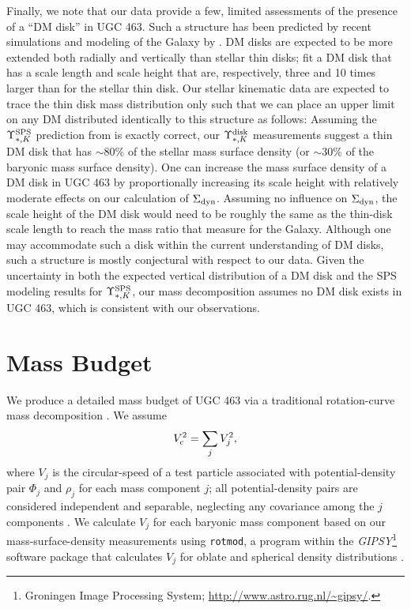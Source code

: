 \documentclass[apj,iop,numberedappendix]{emulateapj}
\begin{document}
Finally, we note that our data provide a few, limited assessments of the
presence of a ``DM disk'' in UGC 463.  Such a structure has been predicted by
recent simulations \citep[e.g.,][]{2009MNRAS.397...44R} and modeling of the
Galaxy by \citet{2003ApJ...588..805K} \citep[cf.,][]{2010ApJ...724L.122M}.  DM
disks are expected to be more extended both radially and vertically than stellar
thin disks; \citet{2003ApJ...588..805K} fit a DM disk that has a scale length
and scale height that are, respectively, three and 10 times larger than for the
stellar thin disk.  Our stellar kinematic data are expected to trace the thin
disk mass distribution only such that we can place an upper limit on any DM
distributed identically to this structure as follows:  Assuming the $\Upsilon_{\ast,K}^{\rm SPS}$
prediction from  is exactly correct, our
$\Upsilon_{\ast,K}^{\rm disk}$ measurements suggest a thin DM disk that has $\sim80$\% of the
stellar mass surface density (or $\sim30$\% of the baryonic mass surface
density).  One can increase the mass surface density of a DM disk in UGC 463 by
proportionally increasing its scale height with relatively moderate effects on
our calculation of $\Sigma_{\rm dyn}$.  Assuming no influence on $\Sigma_{\rm dyn}$, the scale
height of the DM disk would need to be roughly the same as the thin-disk scale
length to reach the mass ratio that \citet{2003ApJ...588..805K} measure for the
Galaxy.  Although one may accommodate such a disk within the current
understanding of DM disks, such a structure is mostly conjectural with respect
to our data.  Given the uncertainty in both the expected vertical distribution
of a DM disk and the SPS modeling results for $\Upsilon_{\ast,K}^{\rm SPS}$, our mass decomposition
assumes no DM disk exists in UGC 463, which is consistent with our observations.

\section{Mass Budget}
\label{sec:mass}

We produce a detailed mass budget of UGC 463 via a traditional rotation-curve
mass decomposition \citep[e.g.,][]{1985ApJ...294..494C, 1985ApJ...295..305V,
1991MNRAS.249..523B}.  We assume
%
\begin{equation}
%
\vc^2 = \sum_j V_j^2,
%
\label{eq:vcirc}
%
\end{equation}
%
where $V_j$ is the circular-speed of a test particle associated with
potential-density pair $\Phi_j$ and $\rho_j$ for each mass component $j$; all
potential-density pairs are considered independent and separable, neglecting any
covariance among the $j$ components \citep[cf.,
;][]{2010A&A...519A..47A}.  We calculate $V_j$
for each baryonic mass component based on our mass-surface-density measurements
using {\tt rotmod}, a program within the {\it GIPSY}\footnote{
%
Groningen Image Processing System; \url{http://www.astro.rug.nl/~gipsy/}.
%
} software package that calculates $V_j$ for oblate and spherical density
distributions \citep[following][]{1983MNRAS.203..735C}.
\end{document}
